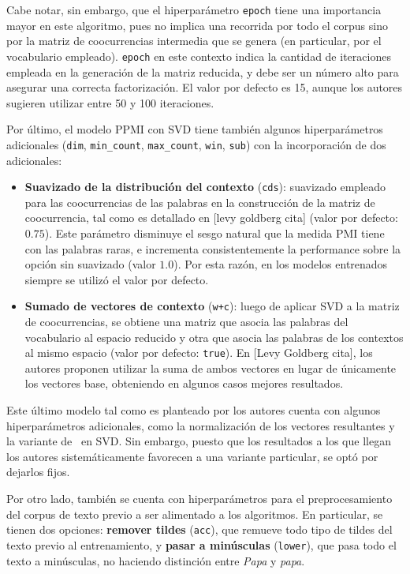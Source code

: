 Cabe notar, sin embargo, que el hiperparámetro \texttt{epoch} tiene una importancia mayor en este
algoritmo, pues no implica una recorrida por todo el corpus sino por la matriz de coocurrencias
intermedia que se genera (en particular, por el vocabulario empleado). \texttt{epoch} en este
contexto indica la cantidad de iteraciones empleada en la generación de la matriz reducida, y debe
ser un número alto para asegurar una correcta factorización. El valor por defecto es 15, aunque los
autores sugieren utilizar entre 50 y 100 iteraciones.

Por último, el modelo PPMI con SVD tiene también algunos hiperparámetros adicionales (\texttt{dim},
\texttt{min\_count}, \texttt{max\_count}, \texttt{win}, \texttt{sub}) con la incorporación de dos
adicionales:

\begin{itemize}

\item \textbf{Suavizado de la distribución del contexto} (\texttt{cds}): suavizado empleado para las
coocurrencias de las palabras en la construcción de la matriz de coocurrencia, tal como es detallado
en [levy goldberg cita] (valor por defecto: $0.75$). Este parámetro disminuye el sesgo natural que
la medida PMI tiene con las palabras raras, e incrementa consistentemente la performance sobre la
opción sin suavizado (valor $1.0$). Por esta razón, en los modelos entrenados siempre se utilizó el
valor por defecto.

\item \textbf{Sumado de vectores de contexto} (\texttt{w+c}): luego de aplicar SVD a la matriz de
coocurrencias, se obtiene una matriz que asocia las palabras del vocabulario al espacio reducido y
otra que asocia las palabras de los contextos al mismo espacio (valor por defecto:
\texttt{true}). En [Levy Goldberg cita], los autores proponen utilizar la suma de ambos vectores en
lugar de únicamente los vectores base, obteniendo en algunos casos mejores resultados.

\end{itemize}

Este último modelo tal como es planteado por los autores cuenta con algunos hiperparámetros
adicionales, como la normalización de los vectores resultantes y la variante de~\cite{Caron2001} en
SVD\@. Sin embargo, puesto que los resultados a los que llegan los autores sistemáticamente
favorecen a una variante particular, se optó por dejarlos fijos.


Por otro lado, también se cuenta con hiperparámetros para el preprocesamiento del corpus de texto
previo a ser alimentado a los algoritmos. En particular, se tienen dos opciones: \textbf{remover
tildes} (\texttt{acc}), que remueve todo tipo de tildes del texto previo al entrenamiento, y
\textbf{pasar a minúsculas} (\texttt{lower}), que pasa todo el texto a minúsculas, no haciendo
distinción entre \textit{Papa} y \textit{papa}.

